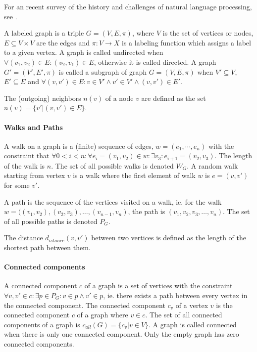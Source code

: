 For an recent survey of the history and challenges of natural language processing, see \cite{Chowdhury2003,DeCastilho2014}.

A labeled graph \cite[p.~1]{Bondy1976} is a triple $G = (V, E, \pi)$, where $V$ is the set of vertices or nodes, $E \subseteq V \times V$ are the edges and $\pi: V \to X$ is a labeling function which assigns a label to a given vertex. 
A graph is called undirected when $\forall (v_1, v_2) \in E: (v_2, v_1) \in E$, otherwise it is called directed. 
A graph $G'=(V', E', \pi)$ is called a subgraph of graph $G = (V, E, \pi)$ when $V' \subseteq V$, $E' \subseteq E$ and $\forall (v, v') \in E: v \in V' \land v' \in V' \land (v, v') \in E'$.

The (outgoing) neighbors $n(v)$ of a node $v$ are defined as the set $n(v) = \{v' | (v, v') \in E \}$.

\paragraph{Walks and Paths}
A walk on a graph is a (finite) sequence of edges, $w = (e_1, \cdots, e_n)$ with the constraint that $\forall 0 < i < n: \forall e_i = (v_1, v_2) \in w: \exists v_3: e_{i + 1} = (v_2, v_3)$. The length of the walk is $n$.
The set of all possible walks is denoted $W_G$.
A random walk starting from vertex $v$ is a walk where the first element of walk $w$ is $e = (v, v')$ for some $v'$.

A path is the sequence of the vertices visited on a walk, ie. for the walk $w = ((v_1, v_2), (v_2, v_3), \dots, (v_{n-1}, v_n)$, the path is $(v_1, v_2, v_3, \dots, v_n)$.
The set of all possible paths is denoted $P_G$.

The distance $d_{istance}(v, v')$ between two vertices is defined as the length of the shortest path between them.

\paragraph{Connected components}
A connected component $c$ of a graph is a set of vertices with the constraint $\forall v, v' \in c: \exists p \in P_G: v \in p \land v' \in p$, ie. there exists a path between every vertex in the connected component.
The connected component $c_v$ of a vertex $v$ is the connected component $c$ of a graph where $v \in c$.
The set of all connected components of a graph is $c_{all}(G) = \{ c_v | v \in V \}$. A graph is called connected when there is only one connected component. Only the empty graph has zero connected components.

